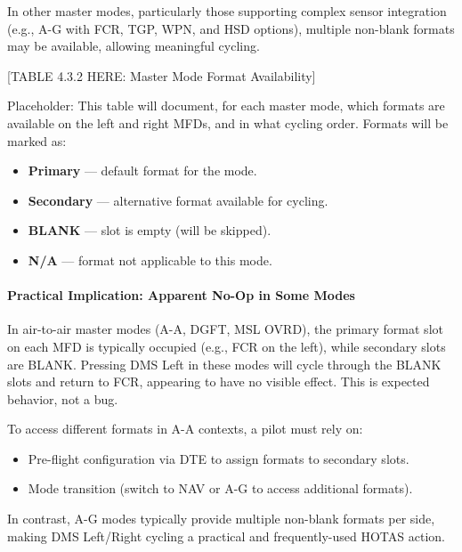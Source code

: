\documentclass[11pt,a4paper]{article}
\begin{document}
In other master modes, particularly those supporting complex sensor integration (e.g., A-G with FCR, TGP, WPN, and HSD options), multiple non-blank formats may be available, allowing meaningful cycling.

[TABLE 4.3.2 HERE: Master Mode Format Availability]

Placeholder: This table will document, for each master mode, which formats are available on the left and right MFDs, and in what cycling order. Formats will be marked as:

\begin{itemize}

\item \textbf{Primary} — default format for the mode.

\item \textbf{Secondary} — alternative format available for cycling.

\item \textbf{BLANK} — slot is empty (will be skipped).

\item \textbf{N/A} — format not applicable to this mode.

\end{itemize}

\paragraph*{Practical Implication: Apparent No-Op in Some Modes}

In air-to-air master modes (A-A, DGFT, MSL OVRD), the primary format slot on each MFD is typically occupied (e.g., FCR on the left), while secondary slots are BLANK. Pressing DMS Left in these modes will cycle through the BLANK slots and return to FCR, appearing to have no visible effect. This is expected behavior, not a bug.

To access different formats in A-A contexts, a pilot must rely on:

\begin{itemize}

\item Pre-flight configuration via DTE to assign formats to secondary slots.

\item Mode transition (switch to NAV or A-G to access additional formats).

\end{itemize}

In contrast, A-G modes typically provide multiple non-blank formats per side, making DMS Left/Right cycling a practical and frequently-used HOTAS action.
\end{document}
